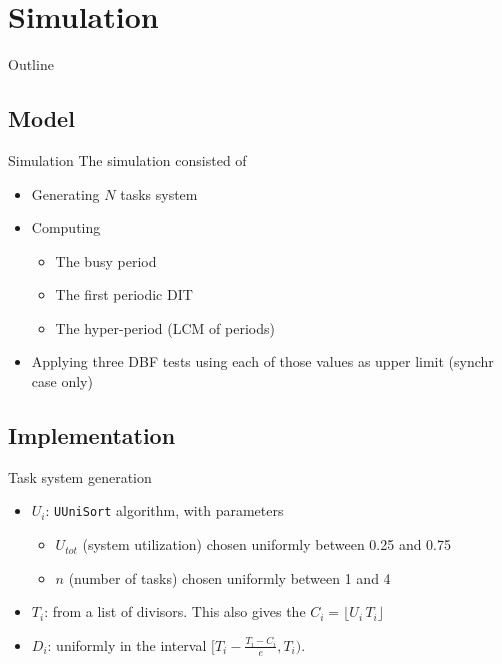 \documentclass{beamer}
\begin{document}
\section{Simulation}

\begin{frame}{Outline}
    \tableofcontents[currentsection]
\end{frame}

\subsection{Model}

\begin{frame}{Simulation}
    The simulation consisted of
    \begin{itemize}
      \item Generating $N$ tasks system
      \item Computing
        \begin{itemize}
          \item The busy period
          \item The first periodic DIT
          \item The hyper-period (LCM of periods)
        \end{itemize}
      \item Applying three DBF tests using each of those values as upper limit (synchr case only)
    \end{itemize}
\end{frame}

\subsection{Implementation}

\begin{frame}{Task system generation}
    \begin{itemize}
      \item $U_i$: \texttt{UUniSort} algorithm, with parameters
      \begin{itemize}
        \item $U_{tot}$ (system utilization) chosen uniformly between 0.25 and 0.75
        \item $n$ (number of tasks) chosen uniformly between 1 and 4
      \end{itemize}
      \item $T_i$: from a list of divisors. This also gives the $    C_i = \lfloor U_i \, T_i \rfloor$
      \item $D_i$: uniformly in the interval $[T_i - \frac{T_i - C_i}{e}, T_i)$.
    \end{itemize}
\end{frame}
\end{document}
